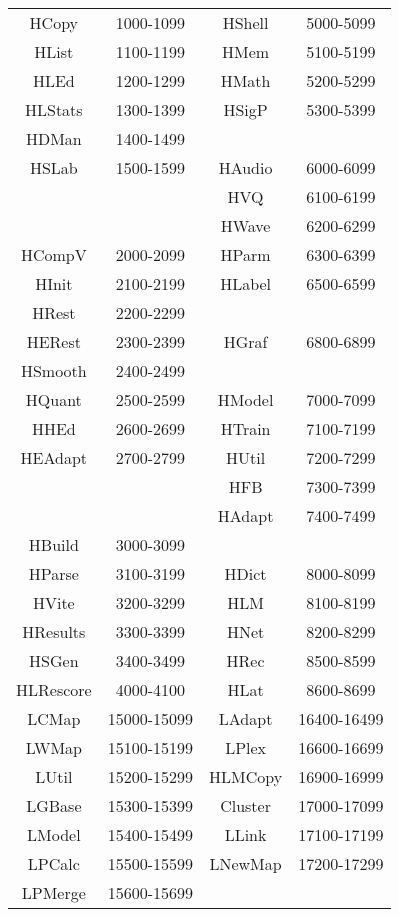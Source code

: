 \begin{itemize}
\begin{center}
\begin{tabular}{|c|c|c|c|}
\hline
HCopy    & 1000-1099     & HShell        & 5000-5099    \\
HList    & 1100-1199     & HMem          & 5100-5199    \\
HLEd     & 1200-1299     & HMath         & 5200-5299    \\
HLStats  & 1300-1399     & HSigP         & 5300-5399    \\
HDMan    & 1400-1499     &               &              \\
HSLab    & 1500-1599     & HAudio        & 6000-6099    \\
         &               & HVQ           & 6100-6199    \\
         &               & HWave         & 6200-6299    \\
HCompV   & 2000-2099     & HParm         & 6300-6399    \\
HInit    & 2100-2199     & HLabel        & 6500-6599    \\
HRest    & 2200-2299     &               &              \\
HERest   & 2300-2399     & HGraf         & 6800-6899    \\
HSmooth  & 2400-2499     &               &              \\
HQuant   & 2500-2599     & HModel        & 7000-7099    \\
HHEd     & 2600-2699     & HTrain        & 7100-7199    \\
HEAdapt  & 2700-2799     & HUtil         & 7200-7299    \\
         &               & HFB           & 7300-7399    \\
         &               & HAdapt        & 7400-7499    \\
HBuild   & 3000-3099     &               &              \\
HParse   & 3100-3199     & HDict         & 8000-8099    \\
HVite    & 3200-3299     & HLM           & 8100-8199    \\
HResults & 3300-3399     & HNet          & 8200-8299    \\
HSGen    & 3400-3499     & HRec          & 8500-8599    \\
HLRescore& 4000-4100     & HLat          & 8600-8699    \\
\hline
LCMap    & 15000-15099   & LAdapt        & 16400-16499  \\
LWMap    & 15100-15199   & LPlex         & 16600-16699  \\
LUtil    & 15200-15299   & HLMCopy       & 16900-16999  \\
LGBase   & 15300-15399   & Cluster       & 17000-17099  \\
LModel   & 15400-15499   & LLink         & 17100-17199  \\
LPCalc   & 15500-15599   & LNewMap       & 17200-17299  \\
LPMerge  & 15600-15699   &               &              \\
\hline
\end{tabular}
\end{center}


\end{itemize}

